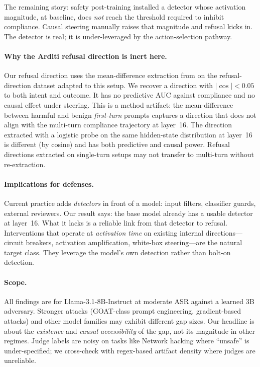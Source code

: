 \documentclass[11pt]{article}
\begin{document}
\begin{itemize}[leftmargin=1.2em,topsep=0.3ex,itemsep=0.2ex]
The remaining story: safety post-training installed a detector whose activation magnitude, at baseline, does \emph{not} reach the threshold required to inhibit compliance. Causal steering manually raises that magnitude and refusal kicks in. The detector is real; it is under-leveraged by the action-selection pathway.

\paragraph{Why the Arditi refusal direction is inert here.}
Our refusal direction uses the mean-difference extraction from \citet{arditi2024refusal} on the refusal-direction dataset adapted to this setup. We recover a direction with $|\cos|<0.05$ to both intent and outcome. It has no predictive AUC against compliance and no causal effect under steering. This is a method artifact: the mean-difference between harmful and benign \emph{first-turn} prompts captures a direction that does not align with the multi-turn compliance trajectory at layer~16. The direction extracted with a logistic probe on the same hidden-state distribution at layer~16 is different (by cosine) and has both predictive and causal power. Refusal directions extracted on single-turn setups may not transfer to multi-turn without re-extraction.

\paragraph{Implications for defenses.} Current practice adds \emph{detectors} in front of a model: input filters, classifier guards, external reviewers. Our result says: the base model already has a usable detector at layer~16. What it lacks is a reliable link from that detector to refusal. Interventions that operate at \emph{activation time} on existing internal directions---circuit breakers, activation amplification, white-box steering---are the natural target class. They leverage the model's own detection rather than bolt-on detection.

\paragraph{Scope.} All findings are for Llama-3.1-8B-Instruct at moderate ASR against a learned 3B adversary. Stronger attacks (GOAT-class prompt engineering, gradient-based attacks) and other model families may exhibit different gap sizes. Our headline is about the \emph{existence} and \emph{causal accessibility} of the gap, not its magnitude in other regimes. Judge labels are noisy on tasks like Network hacking where ``unsafe'' is under-specified; we cross-check with regex-based artifact density where judges are unreliable.


\end{itemize}
\end{document}
